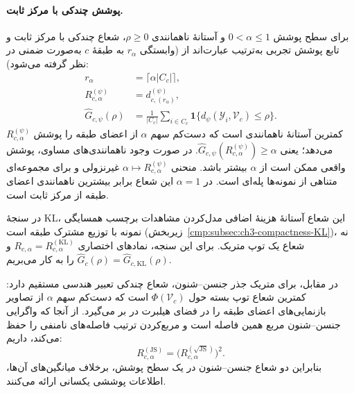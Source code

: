 \paragraph{پوشش چندکی با مرکز ثابت.}
برای سطح پوشش $0<\alpha\le1$ و آستانهٔ ناهمانندی
$\rho\ge0$، شعاع چندکی با مرکز ثابت و تابع پوشش
تجربی به‌ترتیب عبارت‌اند از (وابستگی $r_\alpha$
به طبقهٔ $c$ به‌صورت ضمنی در نظر گرفته می‌شود):
\begin{equation}\label{cmp:eq:ch3-outlier-quantile-coverage}
\boxed{\begin{aligned}
r_\alpha&=\lceil\alpha|C_c|\rceil,\\
R_{c,\alpha}^{(\psi)}
&=d_{c,(r_\alpha)}^{(\psi)},\\
\widehat G_{c,\psi}(\rho)
&=\frac1{|C_c|}\sum_{i\in C_c}
\mathbf1\{d_\psi(\mathscr Y_i,\mathcal V_c)\le \rho\}.
\end{aligned}}
\end{equation}
$R_{c,\alpha}^{(\psi)}$ کمترین آستانهٔ ناهمانندی
است که دست‌کم سهم $\alpha$ از اعضای طبقه را
پوشش می‌دهد؛ یعنی
$\widehat G_{c,\psi}(R_{c,\alpha}^{(\psi)})\ge\alpha$.
در صورت وجود ناهمانندی‌های مساوی، پوشش واقعی
ممکن است از $\alpha$ بیشتر باشد. منحنی
$\alpha\mapsto R_{c,\alpha}^{(\psi)}$ غیرنزولی
و برای مجموعه‌ای متناهی از نمونه‌ها پله‌ای است.
در $\alpha=1$ این شعاع برابر بیشترین ناهمانندی
اعضای طبقه از مرکز ثابت است.

در سنجهٔ KL، این شعاع آستانهٔ هزینهٔ اضافی
مدل‌کردن مشاهدات برچسب همسایگی نمونه با توزیع
مشترک طبقه است (زیربخش~\ref{cmp:subsec:ch3-compactness-KL})،
نه شعاع یک توپ متریک. برای این سنجه، نمادهای
اختصاری $R_{c,\alpha}=R_{c,\alpha}^{(\mathrm{KL})}$
و $\widehat G_c(\rho)=\widehat G_{c,\mathrm{KL}}(\rho)$
را به کار می‌بریم.

در مقابل، برای متریک جذر جنسن--شنون، شعاع چندکی
تعبیر هندسی مستقیم دارد: کمترین شعاع توپ بسته
حول $\Phi(\mathcal V_c)$ است که دست‌کم سهم
$\alpha$ از تصاویر بازنمایی‌های اعضای طبقه را
در فضای هیلبرت در بر می‌گیرد.
از آنجا که واگرایی جنسن--شنون مربع همین فاصله
است و مربع‌کردن ترتیب فاصله‌های نامنفی را
حفظ می‌کند، داریم:
\begin{equation}\label{cmp:eq:ch3-quantile-js-square}
R_{c,\alpha}^{(\mathrm{JS})}
=\bigl(R_{c,\alpha}^{(\sqrt{\mathrm{JS}})}\bigr)^2.
\end{equation}
بنابراین دو شعاع جنسن--شنون در یک سطح پوشش،
برخلاف میانگین‌های آن‌ها، اطلاعات پوششی یکسانی
ارائه می‌کنند.

